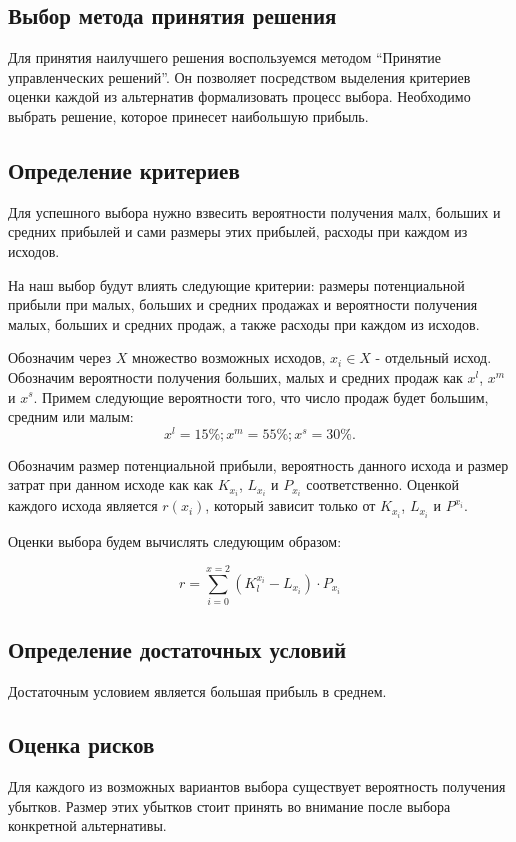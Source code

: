 \documentclass[a4paper,14pt]{extarticle}
\begin{document}
\subsection{Выбор метода принятия решения}
Для принятия наилучшего решения воспользуемся методом \enquote{Принятие\\
управленческих решений}. Он позволяет посредством выделения критериев оценки
каждой из альтернатив формализовать процесс выбора. Необходимо выбрать решение,
которое принесет наибольшую прибыль.

\subsection{Определение критериев}
Для успешного выбора нужно взвесить вероятности получения малх, больших и
средних прибылей и сами размеры этих прибылей, расходы при каждом из исходов.

На наш выбор будут влиять следующие критерии: размеры потенциальной прибыли при
малых, больших и средних продажах и вероятности получения малых, больших и
средних продаж, а также расходы при каждом из исходов.

Обозначим через $X$ множество возможных исходов, $x_i \in X$ - отдельный исход.
Обозначим вероятности получения больших, малых и средних продаж как $x^l$, $x^m$
и $x^s$. Примем следующие вероятности того, что число продаж будет большим, средним или
малым: $$ x^l = 15 \%; x^m = 55 \%; x^s = 30 \%. $$

Обозначим размер потенциальной прибыли, вероятность данного исхода и размер
затрат при данном исходе как как $K_{x_i}$, $L_{x_i}$ и $P_{x_i}$
соответственно. Оценкой каждого исхода является $r(x_i)$, который зависит только
от $K_{x_i}$, $L_{x_i}$ и $P^{x_i}$.

Оценки выбора будем вычислять следующим образом:

$$ r = \sum\limits_{i=0}^{x=2} (K_l^{x_i} - L_{x_i}) \cdot P_{x_i} $$

\subsection{Определение достаточных условий}
Достаточным условием является большая прибыль в среднем.

\subsection{Оценка рисков}

Для каждого из возможных вариантов выбора существует вероятность получения
убытков. Размер этих убытков стоит принять во внимание после выбора конкретной
альтернативы.
\end{document}
